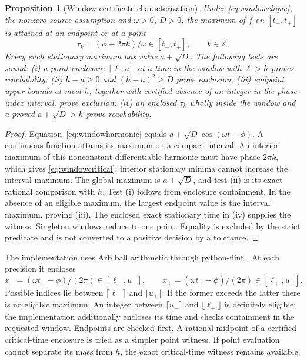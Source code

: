 \documentclass[11pt,a4paper]{article}
\newtheorem{proposition}[theorem]{Proposition}
\theoremstyle{definition}\newtheorem{definition}[theorem]{Definition}
\begin{document}
\begin{proposition}[Window certificate characterization]\label{prop:windowcertificate}
Under \eqref{eq:windowclique}, the nonzero-source assumption and $\omega>0$, $D>0$, the maximum of $f$ on $[t_-,t_+]$ is attained at an endpoint or at a point
\begin{equation}\label{eq:windowcritical}
 \tau_k=(\phi+2\pi k)/\omega\in[t_-,t_+],\qquad k\in\mathbb Z.
\end{equation}
Every such stationary maximum has value $a+\sqrt D$. The following tests are sound:
(i) a point enclosure $[\ell,u]$ at a time in the window with $\ell>h$ proves reachability;
(ii) $h-a\geq0$ and $(h-a)^2\geq D$ prove exclusion;
(iii) endpoint upper bounds at most $h$, together with certified absence of an integer in the phase-index interval, prove exclusion;
(iv) an enclosed $\tau_k$ wholly inside the window and a proved $a+\sqrt D>h$ prove reachability.
\end{proposition}
\begin{proof}
Equation~\eqref{eq:windowharmonic} equals $a+\sqrt D\cos(\omega t-\phi)$. A continuous function attains its maximum on a compact interval. An interior maximum of this nonconstant differentiable harmonic must have phase $2\pi k$, which gives \eqref{eq:windowcritical}; interior stationary minima cannot increase the interval maximum. The global maximum is $a+\sqrt D$, and test (ii) is its exact rational comparison with $h$. Test (i) follows from enclosure containment. In the absence of an eligible maximum, the largest endpoint value is the interval maximum, proving (iii). The enclosed exact stationary time in (iv) supplies the witness. Singleton windows reduce to one point. Equality is excluded by the strict predicate and is not converted to a positive decision by a tolerance.
\end{proof}

The implementation uses Arb ball arithmetic through python-flint \cite{johansson2017,pythonflint}. At each precision it encloses
\begin{equation}\label{eq:phasequotients}
 x_-=(\omega t_--\phi)/(2\pi)\in[\ell_-,u_-],\qquad
 x_+=(\omega t_+-\phi)/(2\pi)\in[\ell_+,u_+].
\end{equation}
Possible indices lie between $\lceil\ell_-\rceil$ and $\lfloor u_+\rfloor$. If the former exceeds the latter there is no eligible maximum. An integer between $\lceil u_-\rceil$ and $\lfloor\ell_+\rfloor$ is definitely eligible; the implementation additionally encloses its time and checks containment in the requested window. Endpoints are checked first. A rational midpoint of a certified critical-time enclosure is tried as a simpler point witness. If point evaluation cannot separate its mass from $h$, the exact critical-time witness remains available.
\end{document}
